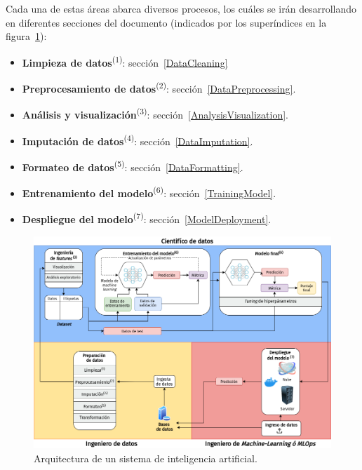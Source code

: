 \documentclass[a4paper,12pt]{article}
\begin{document}
Cada una de estas áreas abarca diversos procesos, los cuáles se irán desarrollando en diferentes secciones del documento (indicados por los superíndices en la figura~\ref{fig:flowchartml.}):
\begin{itemize}[noitemsep]
	\item \textbf{Limpieza de datos}\textsuperscript{(1)}: sección~\ref{DataCleaning}
	\item \textbf{Preprocesamiento de datos}\textsuperscript{(2)}: sección~\ref{DataPreprocessing}.
	\item \textbf{Análisis y visualización}\textsuperscript{(3)}: sección~\ref{AnalysisVisualization}.
	\item \textbf{Imputación de datos}\textsuperscript{(4)}: sección~\ref{DataImputation}.
	\item \textbf{Formateo de datos}\textsuperscript{(5)}: sección~\ref{DataFormatting}.
	\item \textbf{Entrenamiento del modelo}\textsuperscript{(6)}: sección~\ref{TrainingModel}.
	\item \textbf{Despliegue del modelo}\textsuperscript{(7)}: sección~\ref{ModelDeployment}.
\end{itemize}

\begin{figure}[H]
	\begin{center}				
		\includegraphics[width=1\textwidth]{ml-cycle.png}
		\caption{Arquitectura de un sistema de inteligencia artificial.}
		\label{fig:flowchartml.}
	\end{center}
\end{figure}

\end{document}
